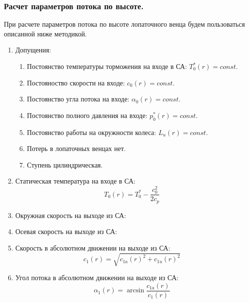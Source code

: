 \documentclass[a4paper,12pt]{article}
\begin{document}
    \subsubsection{Расчет параметров потока по высоте.}
%    

    При расчете параметров потока по высоте лопаточного венца будем пользоваться описанной ниже методикой.

    \begin{enumerate}

        \item Допущения:

        \begin{enumerate}

            \item Постоянство температуры торможения на входе в СА: $T_0^*(r) = const$.
            \item Постояноство скорости на входе: $c_0(r) = const$.
            \item Постоянство угла потока на входе: $\alpha_0(r) = const$.
            \item Постоянство полного давления на входе: $p_0^*(r) = const$.
            \item Постоянство работы на окружности колеса: $L_u(r) = const$.
            \item Потерь в лопаточных венцах нет.
            \item Ступень цилиндрическая.

        \end{enumerate}

%        

        \item Статическая температура на входе в СА:
        \[
            T_0(r) = T_0^* - \frac{c_0 ^ 2}{2 c_p}
        \]

        \item Окружная скорость на выходе из СА:
%        

        \item Осевая скорость на выходе из СА:
%        

        \item Скорость в абсолютном движении на выходе из СА:
        \[
            c_1(r) = \sqrt{c_{1a}(r)^2 + c_{1u}(r)^2}
        \]

        \item Угол потока в абсолютном движении на выходе из СА:
        \[
            \alpha_1 (r) = \arcsin{\frac{c_{1a}(r)}{c_1(r)}}
        \]


\end{enumerate}
\end{document}
